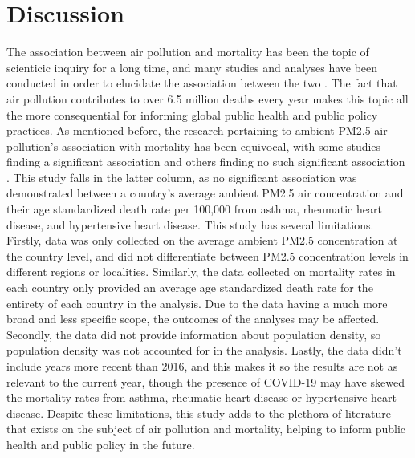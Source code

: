 \documentclass[12pt, letterpaper, twoside]{article}
\begin{document}
\section*{Discussion}
The association between air pollution and mortality has been the topic of
scienticic inquiry for a long time, and many studies and analyses have been
conducted in order to elucidate the association between the two
\citep{dockery1993association, sunyer1996air, jerrett2005spatial, analitis2006short}.
The fact that air pollution contributes to over 6.5 million deaths every year
\citep{fuller2022pollution} makes this topic all the more consequential for
informing global public health and public policy practices. As mentioned before,
the research pertaining to ambient PM2.5 air pollution's association with
mortality has been equivocal, with some studies finding a significant association
\citep{analitis2006short} and others finding no such significant association
\citep{khojasteh2021long}. This study falls in the latter column, as no
significant association was demonstrated between a country's average ambient
PM2.5 air concentration and their age standardized death rate per 100,000 from
asthma, rheumatic heart disease, and hypertensive heart disease.
This study has several limitations. Firstly, data was only collected on the
average ambient PM2.5 concentration at the country level, and did not
differentiate between PM2.5 concentration levels in different regions or
localities. Similarly, the data collected on mortality rates in each country
only provided an average age standardized death rate for the entirety of each
country in the analysis. Due to the data having a much more broad and less
specific scope, the outcomes of the analyses may be affected. Secondly, the data
did not provide information about population density, so population density
was not accounted for in the analysis. Lastly, the data didn't include years
more recent than 2016, and this makes it so the results are not as relevant to
the current year, though the presence of COVID-19 may have skewed the mortality
rates from asthma, rheumatic heart disease or hypertensive heart disease. Despite
these limitations, this study adds to the plethora of literature that exists on
the subject of air pollution and mortality, helping to inform public health and
public policy in the future.



\end{document}
